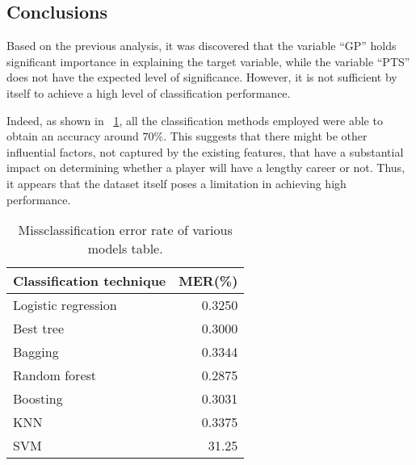 \subsection{Conclusions}

Based on the previous analysis, it was discovered that the variable ``GP'' holds significant importance in explaining the target variable, while the variable ``PTS'' does not have the expected level of significance. 
However, it is not sufficient by itself to achieve a high level of classification performance.

Indeed, as shown in \Tab~\ref{table:ClasEvalParams}, all the classification methods employed were able to obtain an accuracy around $70\%$. This suggests that there might be other influential factors, not captured by the existing features, that have a substantial impact on determining whether a player will have a lengthy career or not. Thus, it appears that the dataset itself poses a limitation in achieving high performance.

\begin{table}[H]
	\centering
	\begin{tabular}{|| l | r ||} 
		\hline
		Classification technique & MER(\%) \\
		\hline
		Logistic regression & 0.3250 \\
		\hline
		Best tree & 0.3000 \\
		\hline
		Bagging & 0.3344 \\
		\hline
		Random forest & 0.2875 \\
		\hline
		Boosting & 0.3031 \\
		\hline
		KNN & 0.3375 \\
		\hline
		SVM & 31.25 \\
		\hline
	\end{tabular}
	\caption{Missclassification error rate of various models table.}
	\label{table:ClasEvalParams}
\end{table}

